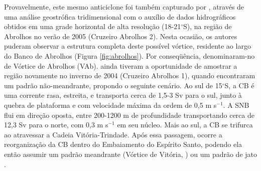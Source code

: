 Provavelmente, este mesmo anticiclone foi também capturado por \cite{silveira_etal2006B}, através 
de uma análise geostrófica tridimensional com o auxílio de dados hidrográficos
obtidos em uma grade horizontal de alta resolução (18-21$^\circ$S), na região de Abrolhos
no verão de 2005 (Cruzeiro Abrolhos 2). Nesta ocasião,
os autores puderam observar a estrutura completa deste possível vórtice, 
residente ao largo do Banco de Abrolhos (Figura \ref{fig:abrolhos}). Por conseq\"uência, 
denominaram-no de Vórtice de Abrolhos (VAb).
\cite{silveira_etal2006B} ainda 
tiveram a oportunidade de amostrar a região novamente no inverno de 2004 (Cruzeiro Abrolhos 1),
quando encontraram um padrão não-meandrante, propondo o seguinte cenário.
Ao sul de 15$^\circ$S, a CB é uma corrente rasa, estreita, e transporta cerca
de 1,5-3 Sv para o sul, junto à quebra de plataforma e com velocidade máxima da
ordem de 0,5 m s$^{-1}$. A SNB flui em direção oposta, entre 200-1200 m
de profundidade transportando cerca de 12,3 Sv para o norte, com 0,3 m s$^{-1}$
em seu núcleo. Mais ao sul, a CB se trifurca ao atravessar a Cadeia Vitória-Trindade.
Após essa passagem, ocorre a reorganização da CB dentro do Embaiamento do Espírito
Santo, podendo ela então assumir um padrão meandrante (Vórtice de Vitória, \cite{schmid_etal1995}) ou um
padrão de jato \citep{evans_etal1983}.

